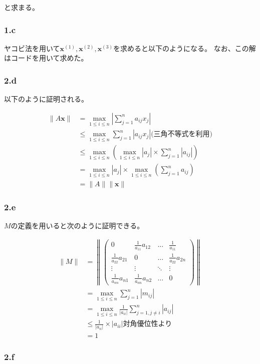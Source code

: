 \documentclass[a4paper]{jsarticle}
\begin{document}
と求まる。

\subsubsection*{1.c}
ヤコビ法を用いて\(\bm{x}^{(1)}, \bm{x}^{(2)}, \bm{x}^{(3)}\)を求めると以下のようになる。
なお、この解はコードを用いて求めた。

\subsubsection*{2.d}
以下のように証明される。

\begin{align*}
  \|A\bm{x}\| &= \max_{1 \leq i \leq n} |\sum_{j = 1}^{n}a_{ij}x_{j}| \\
              &\leq \max_{1 \leq i \leq n} \sum_{j = 1}^{n}|a_{ij}x_{j}| \text{(三角不等式を利用)} \\
              &\leq \max_{1 \leq i \leq n} (\max_{1 \leq i \leq n}|a_j| \times \sum_{j=1}^{n}|a_{ij}|) \\
              &= \max_{1 \leq i \leq n}|a_j| \times \max_{1 \leq i \leq n}(\sum_{j = 1}^{n}a_{ij}) \\
              &= \|A\| \|\bm{x}\|
\end{align*}

\subsubsection*{2.e}
\(M\)の定義を用いると次のように証明できる。

\begin{align*}
  \|M\| &= \left \|
  \begin{pmatrix}
    0 & \frac{1}{a_{11}}a_{12} & \dots & \frac{1}{a_{11}} \\
    \frac{1}{a_{22}}a_{21} & 0 & \dots & \frac{1}{a_{22}}a_{2n} \\
    \vdots & \vdots & \ddots & \vdots \\
    \frac{1}{a_{nn}}a_{n1} & \frac{1}{a_{nn}}a_{n2} & \dots & 0
  \end{pmatrix} \right \| \\
  &= \max_{1 \leq i \leq n} \sum_{j = 1}^{n} \left | m_{ij} \right | \\
  &= \max_{1 \leq i \leq n} \frac{1}{\left |a_{ii} \right |} \sum_{j = 1, j \neq i}^{n} \left | a_{ij} \right | \\
  &\leq \frac{1}{\left | a_{ii} \right |} \times \left | a_{ii} \right | \text{対角優位性より} \\
  &= 1
\end{align*}

\subsubsection*{2.f}
\end{document}
